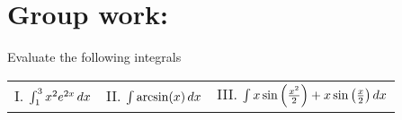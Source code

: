 \documentclass[]{ximera}
\begin{document}
\section{Group work:}


\begin{problem}
Evaluate the following integrals
\begin{center}
\begin{tabular}{lll}
I. $\int_1^3 x^2 e^{2x} \mathop{}\!d x$ \hspace{0.2in} & II. $\int \arcsin(x) \mathop{}\!d x$  \hspace{0.2in} & III. $\int x\sin\left(\frac{x^2}{2}\right) + x\sin\left(\frac{x}{2}\right) \mathop{}\!d x$ %
\end{tabular}
\end{center}
\end{problem}
	
\end{document}
